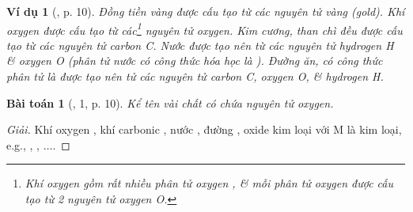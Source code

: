 \documentclass{article}
\newtheorem{baitoan}{Bài toán}
\newtheorem{vidu}{Ví dụ}
\begin{document}
\begin{vidu}[\cite{SGK_KHTN_7_Canh_Dieu}, p. 10]
	Đồng tiền vàng được cấu tạo từ các nguyên tử \emph{vàng (gold)}. Khí oxygen \emph{} được cấu tạo từ các\footnote{Khí oxygen gồm rất nhiều phân tử oxygen , \& mỗi phân tử  oxygen được cấu tạo từ 2 nguyên tử oxygen O.} nguyên tử oxygen. Kim cương, than chì đều được cấu tạo từ các nguyên tử carbon \emph{C}. Nước được tạo nên từ các nguyên tử hydrogen \emph{H} \& oxygen \emph{O} (phân tử nước có công thức hóa học là \emph{}). Đường ăn, có công thức phân tử là \emph{} được tạo nên tử các nguyên tử carbon \emph{C}, oxygen \emph{O}, \& hydrogen \emph{H}.
\end{vidu}

\begin{baitoan}[\cite{SGK_KHTN_7_Canh_Dieu}, 1, p. 10]
	Kể tên vài chất có chứa nguyên tử oxygen.
\end{baitoan}

\begin{proof}[Giải]
	Khí oxygen , khí carbonic , nước , đường , oxide kim loại  với M là kim loại, e.g., , , $\ldots$.
\end{proof}
\end{document}

